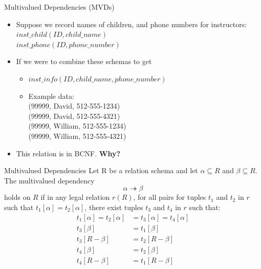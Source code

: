 \documentclass{beamer}
\begin{document}
\begin{frame}{Multivalued Dependencies (MVDs)}
    \begin{itemize}
        \item Suppose we record names of children, and phone numbers for instructors: \\
            \quad $inst\_child(ID, child\_name)$ \\
            \quad $inst\_phone(ID, phone\_number)$
        \item If we were to combine these schemas to get
            \begin{itemize}
                \item $inst\_info(ID, child\_name, phone\_number)$
                \item Example data:\\
                    \quad (99999, David, 512-555-1234) \\
                    \quad (99999, David, 512-555-4321) \\
                    \quad (99999, William, 512-555-1234) \\
                    \quad (99999, William, 512-555-4321)
            \end{itemize}
        \item This relation is in BCNF.  \textbf{Why?}
    \end{itemize}
\end{frame}

\begin{frame}{Multivalued Dependencies}
    Let R be a relation schema and let $\alpha \subseteq R$ and $\beta \subseteq R$. The multivalued dependency
        $$
            \alpha \twoheadrightarrow \beta
        $$
    holds on $R$ if in any legal relation $r(R)$, for all pairs for tuples $t_1$ and $t_2$ in $r$ such that $t_1[\alpha] = t_2[\alpha]$, there exist tuples $t_3$ and $t_4$ in $r$ such that:
        \begin{equation*}
            \begin{align*}
                t_1[\alpha] = t_2[\alpha] &= t_3[\alpha] = t_4[\alpha] \\
                t_3[\beta] &= t_1[\beta] \\
                t_3[R - \beta] &= t_2[R - \beta] \\
                t_4[\beta] &= t_2[\beta] \\
                t_4[R - \beta] &= t_1[R - \beta] \\
            \end{align*}
        \end{equation*}
\end{frame}
\end{document}
